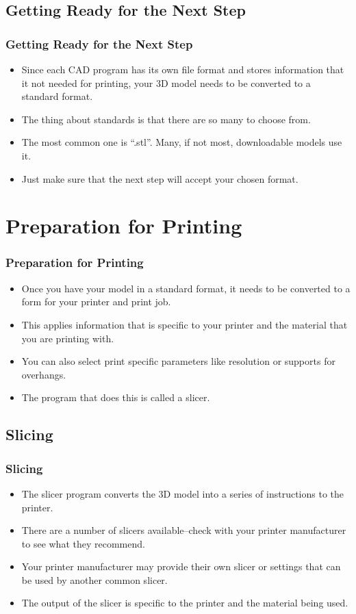 \documentclass[english,10pt]{beamer}
\begin{document}
\subsection{Getting Ready for the Next Step}
\begin{frame}
  \frametitle{Getting Ready for the Next Step}
  \begin{itemize}
    \item Since each CAD program has its own file format and stores information that it not needed for printing, your 3D model needs to be converted to a standard format.
    \item The thing about standards is that there are so many to choose from.
    \item The most common one is  ``.stl''.  Many, if not most, downloadable models use it.
    \item Just make sure that the next step will accept your chosen format.
  \end{itemize}
\end{frame}

\section{Preparation for Printing}
\begin{frame}
  \frametitle{Preparation for Printing}
  \begin{itemize}
    \item Once you have your model in a standard format, it needs to be converted to a form for your printer and print job.
    \item This applies information that is specific to your printer and the material that you are printing with.
    \item You can also select print specific parameters like resolution or supports for overhangs.
    \item The program that does this is called a slicer.
  \end{itemize}
\end{frame}

\subsection{Slicing}
\begin{frame}
  \frametitle{Slicing}
  \begin{itemize}
    \item The slicer program converts the 3D model into a series of instructions to the printer.
    \item There are a number of slicers available--check with your printer manufacturer to see what they recommend.
    \item Your printer manufacturer may provide their own slicer or settings that can be used by another common slicer.
    \item The output of the slicer is specific to the printer and the material being used.
  \end{itemize}
\end{frame}
\end{document}
